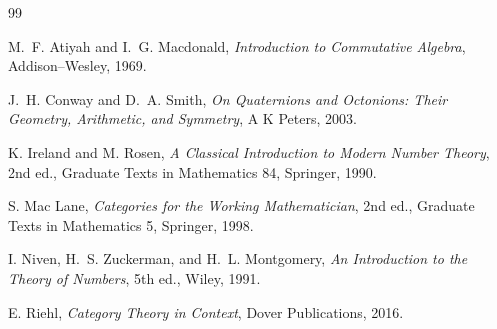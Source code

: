 \documentclass[11pt,a4paper,reqno]{amsart}
\theoremstyle{definition}
\theoremstyle{remark}
\begin{document}
\begin{thebibliography}{99}

M.~F. Atiyah and I.~G. Macdonald,
\emph{Introduction to Commutative Algebra},
Addison--Wesley, 1969.

J.~H. Conway and D.~A. Smith,
\emph{On Quaternions and Octonions: Their Geometry, Arithmetic, and Symmetry},
A K Peters, 2003.

K. Ireland and M. Rosen,
\emph{A Classical Introduction to Modern Number Theory}, 2nd ed.,
Graduate Texts in Mathematics 84, Springer, 1990.

S. Mac Lane,
\emph{Categories for the Working Mathematician}, 2nd ed.,
Graduate Texts in Mathematics 5, Springer, 1998.

I. Niven, H.~S. Zuckerman, and H.~L. Montgomery,
\emph{An Introduction to the Theory of Numbers}, 5th ed.,
Wiley, 1991.

E. Riehl,
\emph{Category Theory in Context},
Dover Publications, 2016.

\end{thebibliography}
\end{document}
